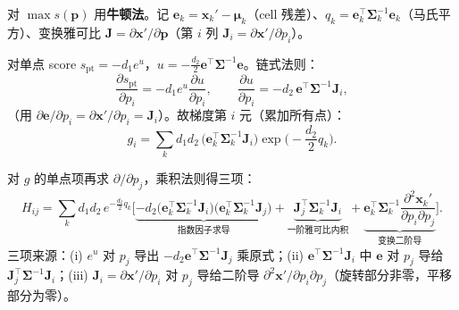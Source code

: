 对 $\max s(\mathbf{p})$ 用\textbf{牛顿法}。记 $\mathbf{e}_k=\mathbf{x}_k'-\boldsymbol{\mu}_k$（cell 残差）、$q_k=\mathbf{e}_k^\top\boldsymbol{\Sigma}_k^{-1}\mathbf{e}_k$（马氏平方）、变换雅可比 $\mathbf{J}=\partial\mathbf{x}'/\partial\mathbf{p}$（第 $i$ 列 $\mathbf{J}_i=\partial\mathbf{x}'/\partial p_i$）。

\begin{derivation}[梯度（链式法则逐步）]
对单点 score $s_{\text{pt}}=-d_1 e^{u}$，$u=-\tfrac{d_2}{2}\mathbf{e}^\top\boldsymbol{\Sigma}^{-1}\mathbf{e}$。链式法则：
\begin{equation}
  \frac{\partial s_{\text{pt}}}{\partial p_i}=-d_1 e^{u}\frac{\partial u}{\partial p_i},\qquad
  \frac{\partial u}{\partial p_i}=-d_2\,\mathbf{e}^\top\boldsymbol{\Sigma}^{-1}\mathbf{J}_i,
\end{equation}
（用 $\partial\mathbf{e}/\partial p_i=\partial\mathbf{x}'/\partial p_i=\mathbf{J}_i$）。故梯度第 $i$ 元（累加所有点）：
\begin{equation}
  g_i=\sum_k d_1 d_2\,\big(\mathbf{e}_k^\top\boldsymbol{\Sigma}_k^{-1}\mathbf{J}_i\big)\exp\!\Big(-\frac{d_2}{2}q_k\Big).
  \label{eq:pc-ndt-grad}
\end{equation}
\end{derivation}

\begin{derivation}
对 $g$ 的单点项再求 $\partial/\partial p_j$，乘积法则得三项：
\begin{equation}
  H_{ij}=\sum_k d_1 d_2\,e^{-\frac{d_2}{2}q_k}\Big[
  \underbrace{-d_2\big(\mathbf{e}_k^\top\boldsymbol{\Sigma}_k^{-1}\mathbf{J}_i\big)\big(\mathbf{e}_k^\top\boldsymbol{\Sigma}_k^{-1}\mathbf{J}_j\big)}_{\text{指数因子求导}}
  +\underbrace{\mathbf{J}_j^\top\boldsymbol{\Sigma}_k^{-1}\mathbf{J}_i}_{\text{一阶雅可比内积}}
  +\underbrace{\mathbf{e}_k^\top\boldsymbol{\Sigma}_k^{-1}\frac{\partial^2\mathbf{x}_k'}{\partial p_i\partial p_j}}_{\text{变换二阶导}}
  \Big].
  \label{eq:pc-ndt-hess}
\end{equation}
三项来源：(i) $e^{u}$ 对 $p_j$ 导出 $-d_2\mathbf{e}^\top\boldsymbol{\Sigma}^{-1}\mathbf{J}_j$ 乘原式；(ii) $\mathbf{e}^\top\boldsymbol{\Sigma}^{-1}\mathbf{J}_i$ 中 $\mathbf{e}$ 对 $p_j$ 导给 $\mathbf{J}_j^\top\boldsymbol{\Sigma}^{-1}\mathbf{J}_i$；(iii) $\mathbf{J}_i=\partial\mathbf{x}'/\partial p_i$ 对 $p_j$ 导给二阶导 $\partial^2\mathbf{x}'/\partial p_i\partial p_j$（旋转部分非零，平移部分为零）。
\end{derivation}

